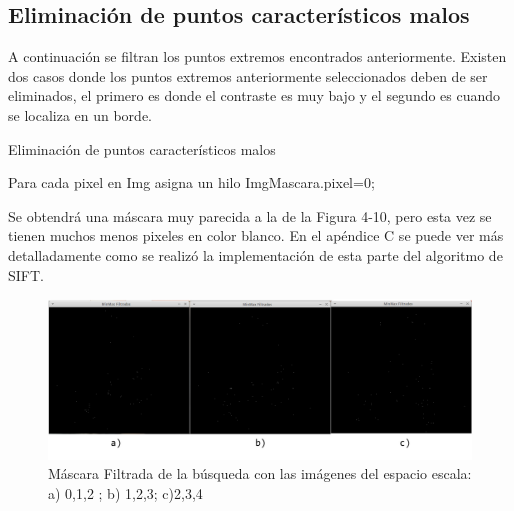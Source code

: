 \subsection{Eliminación de puntos característicos malos}
A continuación se filtran los puntos extremos encontrados anteriormente. Existen dos casos donde los puntos extremos anteriormente seleccionados deben de ser eliminados, el primero es donde el contraste es muy bajo y el segundo es cuando se localiza en un borde.\\
\begin{algorithm}[H]
\caption{Eliminación de puntos característicos malos}
 Para cada pixel en Img asigna un hilo\;
 {
	{
		{
			ImgMascara.pixel=0;
		}
	}
}
\end{algorithm}
Se obtendrá una máscara muy parecida a la de la Figura 4-10, pero esta vez se tienen muchos menos pixeles en color blanco. En el apéndice C se puede ver más detalladamente como se realizó la implementación de esta parte del algoritmo de SIFT.
\begin{figure}[H]
			\centering
				\includegraphics[width=\textwidth]{img/minmax.jpg}
			\caption{Máscara Filtrada de la búsqueda con las imágenes del espacio escala: a) 0,1,2 ; b) 1,2,3; c)2,3,4  }
\end{figure}

